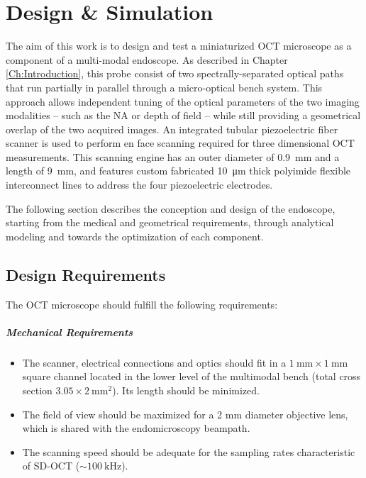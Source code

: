 %

\chapter{Design \& Simulation}
\label{Ch:DesignSimulation}	

The aim of this work is to design and test a miniaturized OCT microscope as a component of a multi-modal endoscope. As described in Chapter \ref{Ch:Introduction}, this probe consist of two spectrally-separated optical paths that run partially in parallel through a micro-optical bench system. This approach allows independent tuning of the optical parameters of the two imaging modalities -- such as the NA or depth of field -- while still providing a geometrical overlap of the two acquired images. An integrated tubular piezoelectric fiber scanner is used to perform en face scanning required for three dimensional OCT measurements. This scanning engine has an outer diameter of \SI{0.9}{\milli\meter} and a length of \SI{9}{\milli\meter}, and features custom fabricated \SI{10}{\micro\meter} thick polyimide flexible interconnect lines to address the four piezoelectric electrodes.

The following section describes the conception and design of the endoscope, starting from the medical and geometrical requirements, through analytical modeling and towards the optimization of each component.

\section{Design Requirements}



The OCT microscope should fulfill the following requirements:

\paragraph{Mechanical Requirements} 
\begin{itemize}

\item The scanner, electrical connections and optics should fit in a $\SI{1}{\milli\meter} \times \SI{1}{\milli\meter}$ square channel located in the lower level of the multimodal bench (total cross section $3.05 \times \SI{2}{\milli\meter^2}$). Its length should be minimized.
\item The field of view should be maximized for a 2 mm diameter objective lens, which is shared with the endomicroscopy beampath.
\item The scanning speed should be adequate for the sampling rates characteristic of SD-OCT ($\sim \SI{100}{\kilo\hertz} $).
\end{itemize}


